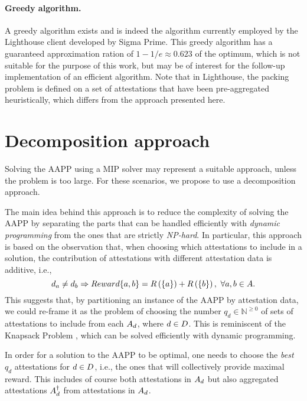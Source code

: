 \documentclass{article}
\begin{document}
\paragraph{Greedy algorithm.} A greedy algorithm exists and is indeed the
algorithm currently employed by the Lighthouse client developed by Sigma Prime.
This greedy algorithm has a guaranteed approximation ration of $1 - 1/e
\approx0.623$ of the optimum, which is not suitable for the purpose of this
work, but may be of interest for the follow-up implementation of an efficient
algorithm. Note that in Lighthouse, the packing problem is defined on a set of
attestations that have been pre-aggregated heuristically, which differs from
the approach presented here.

\section{Decomposition approach}

Solving the AAPP using a MIP solver may represent a suitable approach, unless
the problem is too large. For these scenarios, we propose to use a
decomposition approach.

The main idea behind this approach is to reduce the complexity of solving the
AAPP by separating the parts that can be handled efficiently with \emph{dynamic
programming} from the ones that are strictly \emph{NP-hard}. In particular,
this approach is based on the observation that, when choosing which
attestations to include in a solution, the contribution of attestations with
different attestation data is additive, i.e.,
%
\begin{equation}
  d_{a} \neq d_{b} \Rightarrow Reward{\{ a, b \}} = R\left(\{a\}\right) +
  R\left(\{b\}\right),~ \forall a, b \in A.
\end{equation}
%
This suggests that, by partitioning an instance of the AAPP by attestation
data, we could re-frame it as the problem of choosing the number $q_d \in
\mathbb{N}^{\geq 0}$ of sets of attestations to include from each
$A_{d}$, where $d \in D$. This is reminiscent of the Knapsack
Problem \cite{Martello87}, which can be solved efficiently with dynamic
programming.

In order for a solution to the AAPP to be optimal, one needs to choose the
\emph{best} $q_d$ attestations for $d \in D$, i.e., the ones that will
collectively provide maximal reward. This includes of course both attestations
in $A_{d}$ but also aggregated attestations
$A_{d}^{\dagger}$ from attestations in $A_{d}$.
\end{document}
